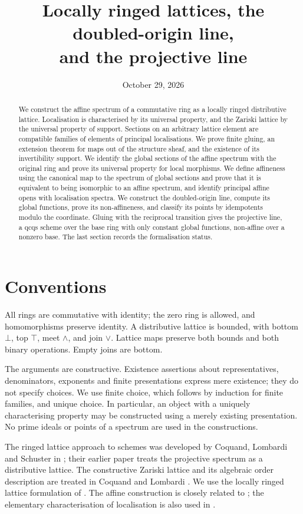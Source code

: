 \documentclass[11pt]{amsart}
\title{Locally ringed lattices, the doubled-origin line,\\
and the projective line}
\date{October 29, 2026}
\theoremstyle{definition}
\theoremstyle{remark}
\begin{document}
\begin{abstract}
We construct the affine spectrum of a commutative ring as a locally
ringed distributive lattice. Localisation is characterised by its
universal property, and the Zariski lattice by the universal property of
support. Sections on an arbitrary lattice element are compatible families
of elements of principal localisations. We prove finite gluing, an
extension theorem for maps out of the structure sheaf, and the existence
of its invertibility support. We identify the global sections of the
affine spectrum with the original ring and prove its universal property
for local morphisms. We define affineness using the canonical map to the
spectrum of global sections and prove that it is equivalent to being
isomorphic to an affine spectrum, and identify principal affine opens
with localisation spectra. We construct the doubled-origin line, compute
its global functions, prove its non-affineness, and classify its points
by idempotents modulo the coordinate. Gluing with the reciprocal
transition gives the projective line, a qcqs scheme over the base ring
with only constant global functions, non-affine over a nonzero base.
The last section records the formalisation status.
\end{abstract}
\maketitle

\section{Conventions}

All rings are commutative with identity; the zero ring is allowed, and
homomorphisms preserve identity. A distributive lattice is bounded, with
bottom $\bot$, top $\top$, meet $\wedge$, and join $\vee$. Lattice maps
preserve both bounds and both binary operations. Empty joins are bottom.

The arguments are constructive. Existence assertions about representatives,
denominators, exponents and finite presentations express mere existence;
they do not specify choices. We use finite choice, which follows by
induction for finite families, and unique choice. In particular, an object
with a uniquely characterising property may be constructed using a merely
existing presentation. No prime ideals or points of a spectrum are used
in the constructions.

The ringed lattice approach to schemes was developed by Coquand,
Lombardi and Schuster in \cite{cls09}; their earlier paper \cite{cls07}
treats the projective spectrum as a distributive lattice. The constructive
Zariski lattice and its algebraic order description are treated in
Coquand and Lombardi \cite{cl03}. We use the locally ringed lattice
formulation of \cite{zeuner}. The affine construction is closely related
to \cite{zm}; the elementary characterisation of localisation is also
used in \cite{isaev}.
\end{document}
